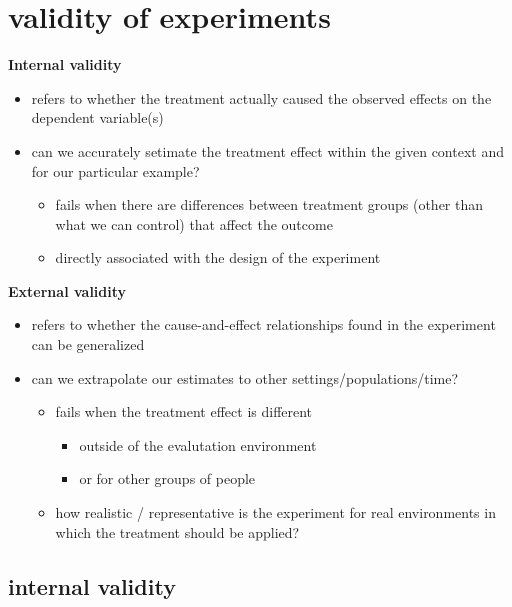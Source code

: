 \documentclass[10pt]{article}
\begin{document}
\section{validity of experiments}
\begin{minipage}[t][0.28\textheight][t]{0.48\textwidth}
\textbf{Internal validity}
\begin{itemize}
    \item refers to whether the treatment actually caused the observed effects on the dependent variable(s)
    \item can we accurately setimate the treatment effect within the given context and for our particular example?
    \begin{itemize}
        \item fails when there are differences between treatment groups (other than what we can control) that affect the outcome
        \item directly associated with the design of the experiment
    \end{itemize}
    \vfill
\end{itemize}
\end{minipage}
\hfill
\begin{minipage}[t][0.28\textheight][t]{0.48\textwidth}
\textbf{External validity}
\begin{itemize}
    \item refers to whether the cause-and-effect relationships found in the experiment can be generalized 
    \item can we extrapolate our estimates to other settings/populations/time?
    \begin{itemize}
        \item fails when the treatment effect is different
        \begin{itemize}
            \item outside of the evalutation environment 
            \item or for other groups of people
        \end{itemize}
        \item how realistic / representative is the experiment for real environments in which the treatment should be applied?
    \end{itemize}
    \vfill
\end{itemize}
\end{minipage}
\vspace{1em}
\newpage 
\subsection{internal validity}
\end{document}
